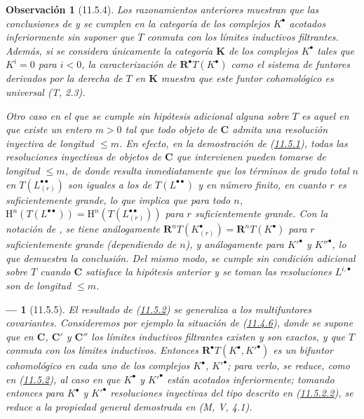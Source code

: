 \documentclass[10pt,oneside,openany]{book}
\theoremstyle{egaenv}\newtheorem*{env}{---}
\theoremstyle{egastatement}
\theoremstyle{egadescription}
\newtheorem*{remark}{Observación}
\newcommand{\oldpage}[2][]{\marginnote{\normalfont\scriptsize\textbf{#1}\,|\,#2}\ignorespaces}
\renewcommand{\leq}{\leqslant}
\begin{document}
\begin{remark}[11.5.4]
\label{0.11.5.4}
\label{0.11.5.4-fr}
Los razonamientos anteriores muestran que las conclusiones de  y  se cumplen en la categoría de los complejos $K^\bullet$ \emph{acotados inferiormente} sin suponer que $T$ conmuta con los límites inductivos filtrantes.
Además, si se considera únicamente la categoría $\boldsymbol{K}$ de los complejos $K^\bullet$ tales que $K^i=0$ para $i<0$, la caracterización de $\mathbf R^\bullet T(K^\bullet)$ como el sistema de funtores derivados por la derecha de $T$ en $\boldsymbol{K}$ muestra que este funtor cohomológico es \emph{universal} (T, 2.3).

Otro caso en el que  se cumple sin hipótesis adicional alguna sobre $T$ es aquel en que existe un entero $m>0$ tal que todo objeto de $\boldsymbol{C}$ admita una resolución inyectiva \emph{de longitud} $\leq m$. En efecto, en la demostración de (\hyperref[0.11.5.1-fr]{11.5.1}), todas las resoluciones inyectivas de objetos de $\boldsymbol{C}$ que intervienen pueden tomarse de longitud $\leq m$, de donde resulta inmediatamente que los términos de grado total $n$ en $T(L_{(r)}^{\bullet\bullet})$ son \emph{iguales a los de} $T(L^{\bullet\bullet})$ y en número \emph{finito}, en cuanto $r$ es suficientemente grande, lo que
implica que para todo $n$,
$\mathrm H^n(T(L^{\bullet\bullet}))=
\mathrm H^n(T(L_{(r)}^{\bullet\bullet}))$
para $r$ suficientemente grande.
Con la notación de , se tiene análogamente
$\mathbf R^nT(K_{(r)}^\bullet)=\mathbf R^nT(K^\bullet)$
para $r$ suficientemente grande (dependiendo de $n$), y análogamente para $K'^\bullet$ y $K''^\bullet$, lo que demuestra la conclusión.
Del mismo modo,  se cumple sin condición adicional sobre $T$ cuando $\boldsymbol{C}$ satisface la hipótesis anterior y se toman las resoluciones $L^{i,\bullet}$ son de longitud $\leq m$.
\end{remark}

\begin{env}[11.5.5]
\label{0.11.5.5-fr}
El resultado de (\hyperref[0.11.5.2-fr]{11.5.2}) se generaliza a los multifuntores covariantes. Consideremos por ejemplo la situación de (\hyperref[0.11.4.6-fr]{11.4.6}), donde se supone que en $\boldsymbol{C}$, $\boldsymbol{C}'$ y $\boldsymbol{C}''$
\oldpage[0\textsubscript{III}]{39}
los límites inductivos filtrantes existen y son exactos, y que $T$ conmuta con los límites inductivos. Entonces $\mathbf R^\bullet T(K^\bullet,K'^\bullet)$ es un bifuntor \emph{cohomológico} en cada uno de los complejos $K^\bullet$, $K'^\bullet$; para verlo, se reduce, como en (\hyperref[0.11.5.2-fr]{11.5.2}), al caso en que $K^\bullet$ y $K'^\bullet$ están acotados inferiormente; tomando entonces para $K^\bullet$ y $K'^\bullet$ resoluciones inyectivas del tipo descrito en (\hyperref[0.11.5.2.2-fr]{11.5.2.2}), se reduce a la propiedad general demostrada en (M, V, 4.1).
\end{env}
\end{document}
